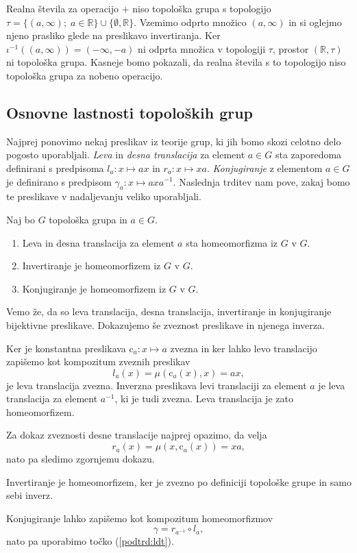 \documentclass[mat1]{fmfdelo}
\newcommand{\R}{\mathbb R}
\begin{document}
\begin{primer}\label{pri:haus}
	Realna števila za operacijo $+$ niso topološka grupa s topologijo $\tau = \lbrace (a, \infty) ;\; a \in \R \rbrace \cup \lbrace \emptyset, \R\rbrace$. Vzemimo odprto množico $(a, \infty)$ in si oglejmo njeno prasliko glede na preslikavo invertiranja. Ker $\iota^{-1}((a, \infty)) = (-\infty, -a)$ ni odprta množica v topologiji $\tau$, prostor $(\R, \tau)$ ni topološka grupa. Kasneje bomo pokazali, da realna števila s to topologijo niso topološka grupa za nobeno operacijo.
\end{primer}

\subsection{Osnovne lastnosti topoloških grup}
Najprej ponovimo nekaj preslikav iz teorije grup, ki jih bomo skozi celotno delo pogosto uporabljali. \emph{Leva} in \emph{desna translacija} za element $a \in G$ sta zaporedoma definirani s predpisoma $l_a\colon x \mapsto ax$ in $r_a\colon x \mapsto xa$. \emph{Konjugiranje} z elementom $a \in G$ je definirano s predpisom $\gamma_a\colon x \mapsto axa^{-1}$. Naslednja trditev nam pove, zakaj bomo te preslikave v nadaljevanju veliko uporabljali.

\begin{trditev}\label{trd:trans}
Naj bo $G$ topološka grupa in $a \in G$.
\begin{enumerate}
\item Leva in desna translacija za element $a$ sta homeomorfizma iz $G$ v $G$.\label{podtrd:ldt}
\item Invertiranje je homeomorfizem iz $G$ v $G$.
\item Konjugiranje je homeomorfizem iz $G$ v $G$.
\end{enumerate}
\end{trditev}

\begin{dokaz}
Vemo že, da so leva translacija, desna translacija, invertiranje in konjugiranje bijektivne preslikave. Dokazujemo še zveznost pre\-sli\-ka\-ve in njenega inverza.

Ker je konstantna preslikava $\text{c}_a\colon x \mapsto a$ zvezna in ker
lahko levo translacijo zapišemo kot kompozitum zveznih preslikav \[l_a(x) = \mu(\text{c}_a(x), x) = ax,\]
je leva translacija zvezna. Inverzna preslikava levi translaciji za element $a$ je leva translacija za element $a^{-1}$, ki je tudi zvezna. Leva translacija je zato homeomorfizem.

Za dokaz zveznosti desne translacije najprej opazimo, da velja
\[r_a(x) = \mu(x, \text{c}_a(x)) = xa,\]
nato pa sledimo zgornjemu dokazu.

Invertiranje je homeomorfizem, ker je zvezno po definiciji topološke grupe in samo sebi inverz.

Konjugiranje lahko zapišemo kot kompozitum homeomorfizmov \[\gamma = r_{a^{-1}} \circ l_a,\]
nato pa uporabimo točko (\ref{podtrd:ldt}).
\end{dokaz}
\end{document}
